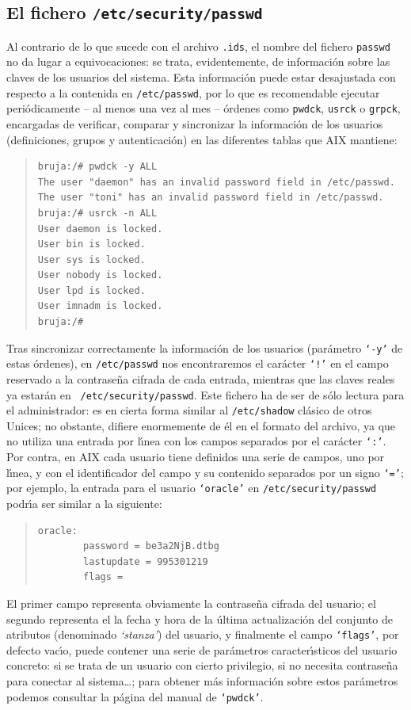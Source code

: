 \subsection{El fichero {\tt /etc/security/passwd}}
Al contrario de lo que sucede con el archivo {\tt .ids}, el nombre del fichero 
{\tt passwd} no da lugar a equivocaciones: se trata, evidentemente, de 
informaci\'on sobre las claves de los usuarios del sistema. Esta informaci\'on
puede estar desajustada con respecto a la contenida en {\tt /etc/passwd}, por
lo que es recomendable ejecutar peri\'odicamente -- al menos una vez al mes --
\'ordenes como {\tt pwdck}, {\tt usrck} o {\tt grpck}, encargadas de verificar, 
comparar y sincronizar la informaci\'on de los usuarios (definiciones, grupos y
autenticaci\'on) en las diferentes tablas que AIX mantiene:
\begin{quote}
\begin{verbatim}
bruja:/# pwdck -y ALL
The user "daemon" has an invalid password field in /etc/passwd.
The user "toni" has an invalid password field in /etc/passwd.
bruja:/# usrck -n ALL
User daemon is locked.
User bin is locked.
User sys is locked.
User nobody is locked.
User lpd is locked.
User imnadm is locked.
bruja:/# 
\end{verbatim}
\end{quote}
Tras sincronizar correctamente la informaci\'on de los usuarios (par\'ametro
{\tt `-y'} de estas \'ordenes), en {\tt /etc/passwd} nos encontraremos el
car\'acter {\tt `!'} en el campo reservado a la contrase\~na cifrada de cada 
entrada, mientras que las claves reales ya estar\'an en {\tt 
/etc/security/passwd}. Este fichero ha de ser de s\'olo lectura para el 
administrador: es en cierta forma similar al {\tt /etc/shadow} cl\'asico de 
otros Unices; no obstante, difiere enormemente de \'el en el formato del 
archivo, ya que no utiliza una entrada por l\'{\i}nea con los campos separados 
por el car\'acter {\tt `:'}. Por contra, en AIX cada usuario tiene definidos
una serie de campos, uno por l\'{\i}nea, y con el identificador del campo y su
contenido separados por un signo {\tt `='}; por ejemplo, la entrada para el
usuario {\tt `oracle'} en {\tt /etc/security/passwd} podr\'{\i}a ser similar a
la siguiente:
\begin{quote}
\begin{verbatim}
oracle:
        password = be3a2NjB.dtbg
        lastupdate = 995301219
        flags = 
\end{verbatim}
\end{quote}
El primer campo representa obviamente la contrase\~na cifrada del usuario;
el segundo representa el la fecha y hora de la \'ultima actualizaci\'on del
conjunto de atributos (denominado {\it `stanza'}) del usuario, y finalmente el
campo {\tt `flags'}, por defecto vac\'{\i}o, puede contener una serie de
par\'ametros caracter\'{\i}sticos del usuario concreto: si se trata de un
usuario con cierto privilegio, si no necesita contrase\~na para conectar al
sistema\ldots; para obtener m\'as informaci\'on sobre estos par\'ametros 
podemos consultar la p\'agina del manual de {\tt `pwdck'}.
